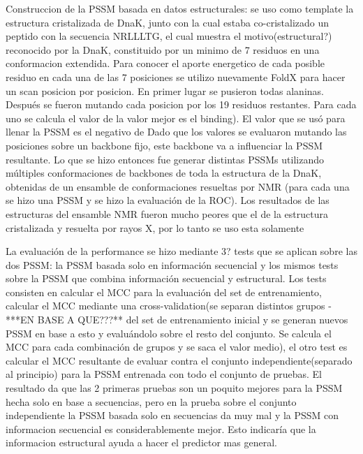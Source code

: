 Construccion de la PSSM basada en datos estructurales: se uso como template la estructura cristalizada de DnaK, junto con la cual estaba co-cristalizado un peptido con la secuencia NRLLLTG, el cual muestra el motivo(estructural?) reconocido por la DnaK, constituido por un minimo de 7 residuos en una conformacion extendida. 
Para conocer el aporte energetico de cada posible residuo en cada una de las 7
posiciones se utilizo nuevamente FoldX para hacer un scan posicion por posicion.
En primer lugar se pusieron todas alaninas. Después se fueron mutando cada
posicion por los 19 residuos restantes. Para cada uno se calcula el valor de la 
valor mejor es el binding). El valor que se usó para llenar la PSSM es el negativo de 
Dado que los valores se evaluaron mutando las posiciones sobre un backbone fijo,
este backbone va a influenciar la PSSM resultante. Lo que se hizo entonces fue
generar distintas PSSMs utilizando múltiples conformaciones de backbones de 
toda la estructura de la DnaK, obtenidas de un ensamble de conformaciones 
resueltas por NMR (para cada una se hizo una PSSM y se hizo la evaluación de 
la ROC). Los resultados de las estructuras del ensamble NMR fueron mucho peores
que el de la estructura cristalizada y resuelta por rayos X, por lo tanto se uso esta
solamente


La evaluación de la performance se hizo mediante 3? tests que se aplican sobre las dos PSSM: la PSSM basada solo en información secuencial y los mismos tests sobre la PSSM que combina información secuencial y estructural. Los tests consisten en calcular el MCC para la evaluación del set de entrenamiento, calcular el MCC mediante una cross-validation(se separan distintos grupos -***EN BASE A QUE???** del set de entrenamiento inicial y se generan nuevos PSSM en base a esto y evaluándolo sobre el resto del conjunto. Se calcula el MCC para cada combinación de grupos y se saca el valor medio), el otro test es calcular el MCC resultante de evaluar contra el conjunto independiente(separado al principio) para la PSSM entrenada con todo el conjunto de pruebas.
El resultado da que las 2 primeras pruebas son un poquito mejores para la PSSM hecha solo en base a secuencias, pero en la prueba sobre el conjunto independiente la PSSM basada solo en secuencias da muy mal y la PSSM con informacion secuencial es considerablemente mejor. Esto indicaría que la informacion estructural ayuda a hacer el predictor mas general.



